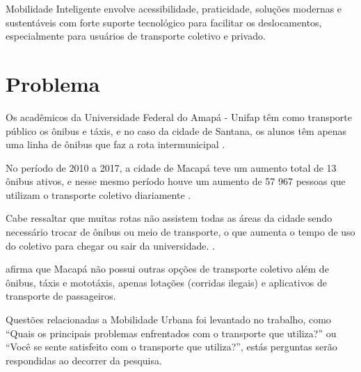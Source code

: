 \begin{comment}
Portanto, com o fim de amenizar o impacto dos combustíveis fósseis e facilitar o trajeto das pessoas, a  Mobilidade inteligente que é um dos conceitos de CI, utiliza recursos tecnológicos para resolver problemas relacionados a Mobilidade Urbana.
\end{comment}

Mobilidade Inteligente envolve acessibilidade, praticidade, soluções modernas e sustentáveis com forte suporte tecnológico para facilitar os deslocamentos, especialmente para usuários de transporte coletivo e privado.

\section {Problema}
\begin{comment}
	Na cidade de Macapá e Santana, as duas maiores cidade do Amapá, o número de transporte coletivo é baixo,
	existe apenas duas rodovias que interligam as cidades, 
	se locomover se torna difícil \cite{sau2018}. %
	
	Com tantos problemas aparentes causadas pelo grande inchaço populacional que  vive nas áreas urbanas, cerca de 80\% da população das duas cidades reside em áreas urbanas e sofre com a insuficiência do sistema de transporte público oferecido \cite{tostes}.
\end{comment}

Os acadêmicos da Universidade Federal do Amapá - Unifap têm como transporte público os ônibus e táxis, e no caso da cidade de Santana, os alunos têm apenas uma linha de ônibus que faz a rota intermunicipal \cite{sau2018}.

No período de 2010 a 2017, a cidade de Macapá teve um aumento total de 13 ônibus ativos, e nesse mesmo período houve um aumento de 57 967 pessoas que utilizam o transporte coletivo diariamente \cite{sau2018}. %
 
Cabe ressaltar que muitas rotas não assistem todas as áreas da cidade sendo necessário trocar de ônibus ou meio de transporte, o que aumenta o tempo de uso do coletivo para chegar ou sair da universidade. \cite{galiano}.

 afirma que Macapá não possui outras opções de transporte coletivo além de ônibus, táxis e mototáxis, apenas lotações (corridas ilegais) e aplicativos de transporte de passageiros.

Questões relacionadas a Mobilidade Urbana foi levantado no trabalho, como ``Quais os principais problemas enfrentados com o transporte que utiliza?'' ou ``Você se sente satisfeito com o transporte que utiliza?'', estás perguntas serão respondidas ao decorrer da pesquisa.






